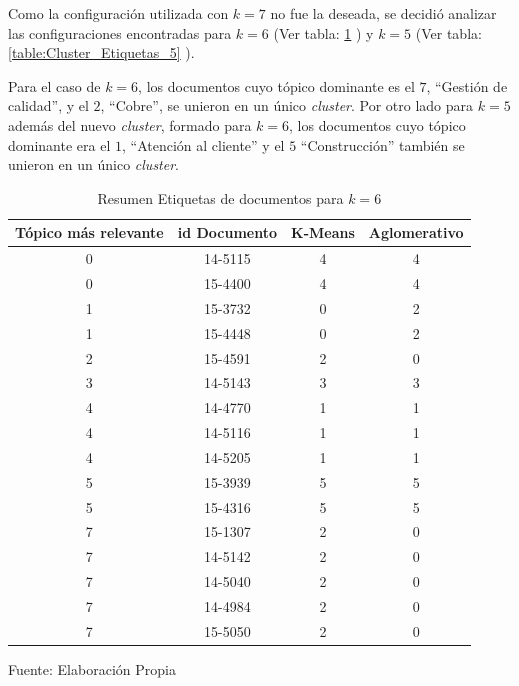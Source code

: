    Como la configuración utilizada con $k=7$ no fue la deseada, se decidió analizar las configuraciones encontradas para $k=6$ (Ver tabla: \ref{table:Cluster_Etiquetas_6} ) y $k=5$ (Ver tabla: \ref{table:Cluster_Etiquetas_5} ). 
   
   Para el caso de $k=6$, los documentos cuyo tópico dominante es el $7$, ``Gestión de calidad'', y el $2$, ``Cobre'', se unieron en un único \textit{cluster}. Por otro lado para $k=5$ además del nuevo \textit{cluster}, formado para $k=6$, los documentos cuyo tópico dominante era el $1$, ``Atención al cliente'' y el $5$ ``Construcción'' también se unieron en un único \textit{cluster}.
   
    \begin{table}[H]
    \centering
    \begin{tabular}{|c|c|c|c|}
    \hline
    Tópico más relevante & id Documento & K-Means & Aglomerativo \\ \hline
    0                    & 14-5115      & 4       & 4            \\ \hline
    0                    & 15-4400      & 4       & 4            \\ \hline
    1                    & 15-3732      & 0       & 2            \\ \hline
    1                    & 15-4448      & 0       & 2            \\ \hline
    2                    & 15-4591      & 2       & 0            \\ \hline
    3                    & 14-5143      & 3       & 3            \\ \hline
    4                    & 14-4770      & 1       & 1            \\ \hline
    4                    & 14-5116      & 1       & 1            \\ \hline
    4                    & 14-5205      & 1       & 1            \\ \hline
    5                    & 15-3939      & 5       & 5            \\ \hline
    5                    & 15-4316      & 5       & 5            \\ \hline
    7                    & 15-1307      & 2       & 0            \\ \hline
    7                    & 14-5142      & 2       & 0            \\ \hline
    7                    & 14-5040      & 2       & 0            \\ \hline
    7                    & 14-4984      & 2       & 0            \\ \hline
    7                    & 15-5050      & 2       & 0            \\ \hline
    \end{tabular}
    \caption{\label{table:Cluster_Etiquetas_6} Resumen Etiquetas de documentos para $k=6$} Fuente: Elaboración Propia
    \end{table}
    
